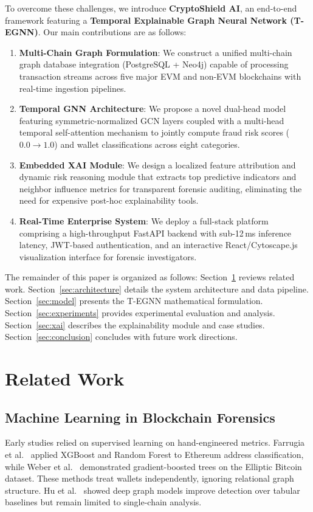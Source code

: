 \documentclass[conference]{IEEEtran}
\begin{document}
To overcome these challenges, we introduce \textbf{CryptoShield AI}, an end-to-end framework featuring a \textbf{Temporal Explainable Graph Neural Network (T-EGNN)}. Our main contributions are as follows:
\begin{enumerate}
    \item \textbf{Multi-Chain Graph Formulation}: We construct a unified multi-chain graph database integration (PostgreSQL + Neo4j) capable of processing transaction streams across five major EVM and non-EVM blockchains with real-time ingestion pipelines.
    \item \textbf{Temporal GNN Architecture}: We propose a novel dual-head model featuring symmetric-normalized GCN layers coupled with a multi-head temporal self-attention mechanism to jointly compute fraud risk scores ($0.0 \rightarrow 1.0$) and wallet classifications across eight categories.
    \item \textbf{Embedded XAI Module}: We design a localized feature attribution and dynamic risk reasoning module that extracts top predictive indicators and neighbor influence metrics for transparent forensic auditing, eliminating the need for expensive post-hoc explainability tools.
    \item \textbf{Real-Time Enterprise System}: We deploy a full-stack platform comprising a high-throughput FastAPI backend with sub-12\,ms inference latency, JWT-based authentication, and an interactive React/Cytoscape.js visualization interface for forensic investigators.
\end{enumerate}

The remainder of this paper is organized as follows: Section~\ref{sec:related} reviews related work. Section~\ref{sec:architecture} details the system architecture and data pipeline. Section~\ref{sec:model} presents the T-EGNN mathematical formulation. Section~\ref{sec:experiments} provides experimental evaluation and analysis. Section~\ref{sec:xai} describes the explainability module and case studies. Section~\ref{sec:conclusion} concludes with future work directions.

\section{Related Work}
\label{sec:related}

\subsection{Machine Learning in Blockchain Forensics}
Early studies relied on supervised learning on hand-engineered metrics. Farrugia et al.~\cite{farrugia2020detection} applied XGBoost and Random Forest to Ethereum address classification, while Weber et al.~\cite{weber2019aml} demonstrated gradient-boosted trees on the Elliptic Bitcoin dataset. These methods treat wallets independently, ignoring relational graph structure. Hu et al.~\cite{hu2021transaction} showed deep graph models improve detection over tabular baselines but remain limited to single-chain analysis.
\end{document}
